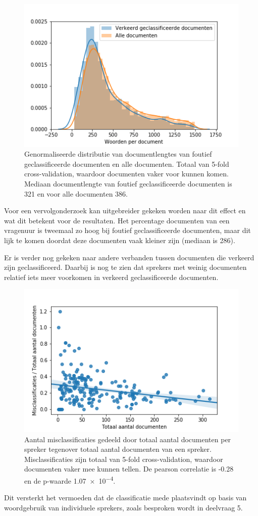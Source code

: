 \begin{figure}[H]
  \centering
    \includegraphics[width=0.40\paperwidth]{Verslag/Tables/misclassifiedlengths.png}
\caption{Genormaliseerde distributie van documentlengtes van foutief geclassificeerde documenten en alle documenten. Totaal van 5-fold cross-validation, waardoor documenten vaker voor kunnen komen. Mediaan documentlengte van foutief geclassificeerde documenten is 321 en voor alle documenten 386.}
\label{fig:misclassified}
\end{figure}
Voor een vervolgonderzoek kan uitgebreider gekeken worden naar dit effect en wat dit betekent voor de resultaten. Het percentage documenten van een vragenuur is tweemaal zo hoog bij foutief geclassificeerde documenten, maar dit lijk te komen doordat deze documenten vaak kleiner zijn (mediaan is 286).\par
Er is verder nog gekeken naar andere verbanden tussen documenten die verkeerd zijn geclassificeerd. Daarbij is nog te zien dat sprekers met weinig documenten relatief iets meer voorkomen in verkeerd geclassificeerde documenten.
\begin{figure}[H]
  \centering
    \includegraphics[width=0.50\paperwidth]{Verslag/Tables/misclassifiedsprekers.png}
\caption{Aantal misclassificaties gedeeld door totaal aantal documenten per spreker tegenover totaal aantal documenten van een spreker. Misclassificaties zijn totaal van 5-fold cross-validation, waardoor documenten vaker mee kunnen tellen. De pearson correlatie is -0.28 en de p-waarde \num{1.07e-4}.}
\label{fig:misclassifiedsprekers}
\end{figure}
Dit versterkt het vermoeden dat de classificatie mede plaatsvindt op basis van woordgebruik van individuele sprekers, zoals besproken wordt in deelvraag 5.\par


